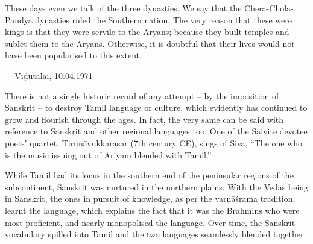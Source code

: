 \begin{myquote}
These days even we talk of the three dynasties. We say that the Chera-Chola-Pandya dynasties ruled the Southern nation. The very reason that these were kings is that they were servile to the Aryans; because they built temples and sublet them to the Aryans. Otherwise, it is doubtful that their lives would not have been popularised to this extent.

~\hfill - Viḍutalai, 10.04.1971
\end{myquote}

\newpage

There is not a single historic record of any attempt – by the imposition of Sanskrit – to destroy Tamil language or culture, which evidently has continued to grow and flourish through the ages. In fact, the very same can be said with reference to Sanskrit and other regional languages too. One of the Saivite devotee poets’ quartet, Tirunāvukkarasar (7th century CE), sings of Siva, “The one who is the music issuing out of Āriyam blended with Tamil.”

\vskip 3.5pt

While Tamil had its locus in the southern end of the peninsular regions of the subcontinent, Sanskrit was nurtured in the northern plains. With the Vedas being in Sanskrit, the ones in pursuit of knowledge, as per the varṇāśrama tradition, learnt the language, which explains the fact that it was the Brahmins who were most proficient, and nearly monopolised the language. Over time, the Sanskrit vocabulary spilled into Tamil and the two languages seamlessly blended together.

\vskip 3.5pt

